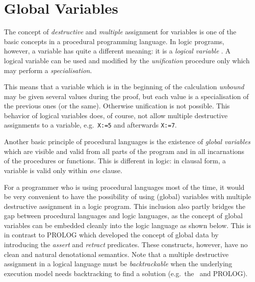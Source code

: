 %
\section{Global Variables}
\label{LOP:GLOBVAR}

The concept of {\em destructive\/} and {\em multiple\/} assignment
for variables is one of the basic concepts in a procedural
programming language.
In logic programs, however, a variable has quite a different meaning:
it is a {\em logical variable\/} \cite{Kow79b}.
A logical variable can be used and modified by the {\em unification\/}
procedure only which may perform a {\em specialisation\/}.

This means that a variable which is in the beginning of the
calculation {\em unbound\/} may be given several values during
the proof, but each value is a specialisation of the previous ones
(or the same).
Otherwise unification is not possible.
This behavior of logical variables does, of course, not allow
multiple destructive assignments to a variable, e.g.\ {\tt X:=5} and
afterwards {\tt X:=7}.

Another basic principle of procedural languages is the existence of
{\em global variables\/} which are visible and valid from all parts
of the program and in all incarnations of the procedures or functions.
This is different in logic: in clausal form, a variable is valid only within
{\em one\/} clause.

For a programmer who is using procedural languages most of the time,
it would be very convenient to have 
the possibility of using (global) variables with multiple destructive
assignment in a logic program.
This inclusion also partly
bridges the gap between procedural languages and logic languages, as
the concept of global variables can be embedded cleanly into the
logic language as shown below.
This is in contrast to PROLOG which developed the concept of global
data by introducing the {\em assert\/} and {\em retract\/}
predicates. These constructs, however, have no clean and
natural denotational semantics.
Note that a multiple destructive assignment in a logical language
must be {\em backtrackable\/} when the underlying execution model
needs backtracking to find a solution (e.g.\ the \SAM\ and  PROLOG).

